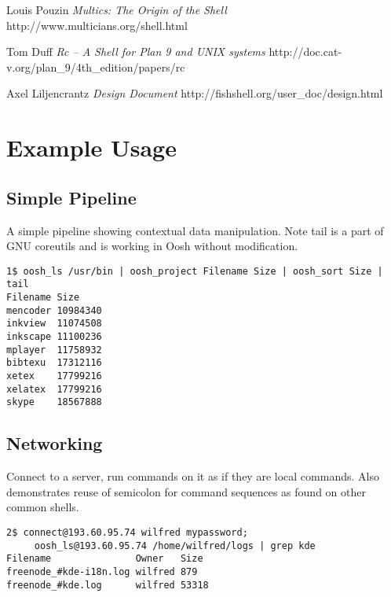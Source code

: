 \documentclass[12pt,twoside,notitlepage]{report}
\begin{document}

\cleardoublepage


\begin{thebibliography}{5} %

  Louis Pouzin
  \emph{Multics: The Origin of the Shell}
  http://www.multicians.org/shell.html

  Tom Duff
  \emph{Rc -- A Shell for Plan 9 and UNIX systems}
  http://doc.cat-v.org/plan\_9/4th\_edition/papers/rc

  Axel Liljencrantz
  \emph{Design Document}
  http://fishshell.org/user\_doc/design.html

\end{thebibliography}
\cleardoublepage

\appendix

\chapter{Example Usage}
\label{examples}

\section{Simple Pipeline}
\label{lsexample}
A simple pipeline showing contextual data manipulation. Note tail is a part of
GNU coreutils and is working in Oosh without modification.
\begin{verbatim}
1$ oosh_ls /usr/bin | oosh_project Filename Size | oosh_sort Size | tail
Filename Size
mencoder 10984340
inkview  11074508
inkscape 11100236
mplayer  11758932
bibtexu  17312116
xetex    17799216
xelatex  17799216
skype    18567888
\end{verbatim}

\section{Networking}
Connect to a server, run commands on it as if they are local commands. Also
demonstrates reuse of semicolon for command sequences as found on other common
shells.
\begin{verbatim}
2$ connect@193.60.95.74 wilfred mypassword;
     oosh_ls@193.60.95.74 /home/wilfred/logs | grep kde
Filename               Owner   Size
freenode_#kde-i18n.log wilfred 879
freenode_#kde.log      wilfred 53318
\end{verbatim}
\end{document}
